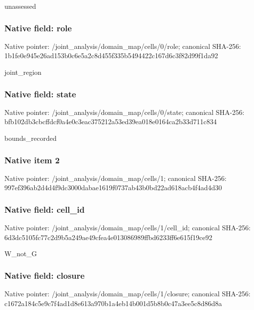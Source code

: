 \documentclass[10pt,a4paper]{article}
\begin{document}
\begingroup\raggedright\sloppy unassessed\par\endgroup

\subsubsection{Native field: role}
Native pointer: /joint\_\allowbreak{}analysis/domain\_\allowbreak{}map/cells/0/role; canonical SHA-256: 1b1fe0e945e26ad153b0c6e5a2c8d455f335b5494422c167d6c3f82d99f1da92

\begingroup\raggedright\sloppy joint\_\allowbreak{}region\par\endgroup

\subsubsection{Native field: state}
Native pointer: /joint\_\allowbreak{}analysis/domain\_\allowbreak{}map/cells/0/state; canonical SHA-256: bfb102db3cbcffdcf0a4e0c3eac375212a53ed39ea018e0164ca2b33d711c834

\begingroup\raggedright\sloppy bounds\_\allowbreak{}recorded\par\endgroup

\subsubsection{Native item 2}
Native pointer: /joint\_\allowbreak{}analysis/domain\_\allowbreak{}map/cells/1; canonical SHA-256: 997ef396ab2d4d4f9dc3000dabae1619f0737ab43b0bd22ad618acb4f4ad4d30

\subsubsection{Native field: cell\_\allowbreak{}id}
Native pointer: /joint\_\allowbreak{}analysis/domain\_\allowbreak{}map/cells/1/cell\_\allowbreak{}id; canonical SHA-256: 6d3dc5105fc77c2d9b5a249ae49cfea4e013086989ffbd6233ff6e615f19ce92

\begingroup\raggedright\sloppy W\_\allowbreak{}not\_\allowbreak{}G\par\endgroup

\subsubsection{Native field: closure}
Native pointer: /joint\_\allowbreak{}analysis/domain\_\allowbreak{}map/cells/1/closure; canonical SHA-256: c1672a184c5e9c7f4ad1d8e613a970b1a4eb14b001d5b8b0c47a3ee5c8d86d8a
\end{document}
